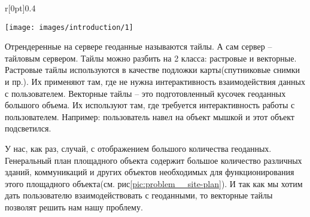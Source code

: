 \begin{wrapfigure}{r}[0pt]{0.4\textwidth}
    \begin{center}
        \texttt{[image: images/introduction/1]}
    \end{center}
    \caption{Пример результата работы}
    \label{pic:problem__site-plan}
\end{wrapfigure}
Отрендеренные на сервере геоданные называются тайлы. А сам сервер -- тайловым сервером.
Тайлы можно разбить на 2 класса: растровые и векторные. Растровые тайлы используются в качестве
подложки карты(спутниковые снимки и пр.). Их применяют там, где не нужна интерактивность взаимодействия данных
с пользователем. Векторные тайлы -- это подготовленный кусочек геоданных большого объема. Их используют там, где
требуется интерактивность работы с пользователем. Например: пользователь навел на объект мышкой и этот объект подсветился.

\vskip 2mm
У нас, как раз, случай, с отображением большого количества геоданных.
Генеральный план площадного объекта содержит большое количество различных зданий, коммуникаций и других объектов
необходимых для функционирования этого площадного объекта(см. рис\ref{pic:problem__site-plan}). И так как мы хотим дать
пользователю взаимодействовать с геоданными, то векторные тайлы позволят решить нам нашу проблему.




